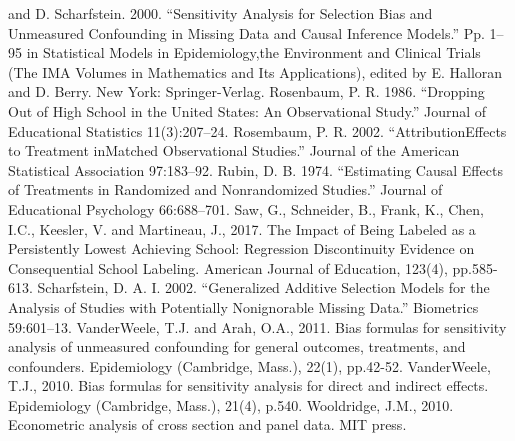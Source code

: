 \documentclass[man]{apa6}
\begin{document}
and D. Scharfstein. 2000. \enquote{Sensitivity Analysis for Selection
Bias and Unmeasured Confounding in Missing Data and Causal Inference
Models.} Pp. 1--95 in Statistical Models in Epidemiology,the Environment
and Clinical Trials (The IMA Volumes in Mathematics and Its
Applications), edited by E. Halloran and D. Berry. New York:
Springer-Verlag. Rosenbaum, P. R. 1986. \enquote{Dropping Out of High
School in the United States: An Observational Study.} Journal of
Educational Statistics 11(3):207--24. Rosembaum, P. R. 2002.
\enquote{AttributionEffects to Treatment inMatched Observational
Studies.} Journal of the American Statistical Association 97:183--92.
Rubin, D. B. 1974. \enquote{Estimating Causal Effects of Treatments in
Randomized and Nonrandomized Studies.} Journal of Educational Psychology
66:688--701. Saw, G., Schneider, B., Frank, K., Chen, I.C., Keesler, V.
and Martineau, J., 2017. The Impact of Being Labeled as a Persistently
Lowest Achieving School: Regression Discontinuity Evidence on
Consequential School Labeling. American Journal of Education, 123(4),
pp.585-613. Scharfstein, D. A. I. 2002. \enquote{Generalized Additive
Selection Models for the Analysis of Studies with Potentially
Nonignorable Missing Data.} Biometrics 59:601--13. VanderWeele, T.J. and
Arah, O.A., 2011. Bias formulas for sensitivity analysis of unmeasured
confounding for general outcomes, treatments, and confounders.
Epidemiology (Cambridge, Mass.), 22(1), pp.42-52. VanderWeele, T.J.,
2010. Bias formulas for sensitivity analysis for direct and indirect
effects. Epidemiology (Cambridge, Mass.), 21(4), p.540. Wooldridge,
J.M., 2010. Econometric analysis of cross section and panel data. MIT
press.
\end{document}
